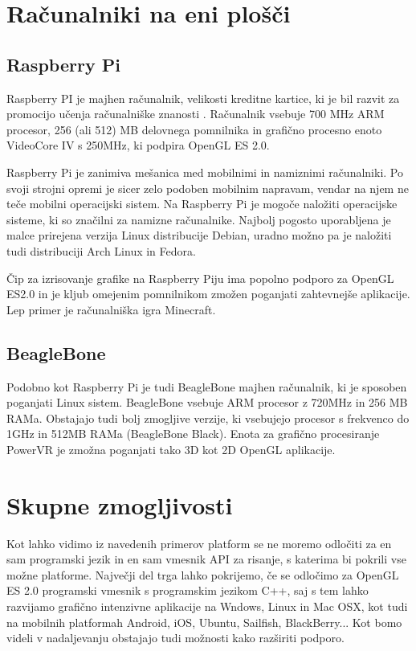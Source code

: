 \section{Računalniki na eni plošči}

\subsection{Raspberry Pi}
\label{sec:raspberryPi}

Raspberry PI je majhen računalnik, velikosti kreditne kartice, ki je bil razvit za promocijo učenja računalniške znanosti \cite{rasPi}. Računalnik vsebuje 700 MHz ARM procesor, 256 (ali 512) MB delovnega pomnilnika in grafično procesno enoto VideoCore IV s 250MHz, ki podpira OpenGL ES 2.0.

Raspberry Pi je zanimiva mešanica med mobilnimi in namiznimi računalniki. Po svoji strojni opremi je sicer zelo podoben mobilnim napravam, vendar na njem ne teče mobilni operacijski sistem. Na Raspberry Pi je mogoče naložiti operacijske sisteme, ki so značilni za namizne računalnike. Najbolj pogosto uporabljena je malce prirejena verzija Linux distribucije Debian, uradno možno pa je naložiti tudi distribuciji Arch Linux in Fedora.

Čip za izrisovanje grafike na Raspberry Piju ima popolno podporo za OpenGL ES2.0 in je kljub omejenim pomnilnikom zmožen poganjati zahtevnejše aplikacije.  Lep primer je računalniška igra Minecraft.

\subsection{BeagleBone}
\label{sec:beagleBone}

Podobno kot Raspberry Pi je tudi BeagleBone \cite{beagleBone} majhen računalnik, ki je sposoben poganjati Linux sistem. BeagleBone vsebuje ARM procesor z 720MHz in 256 MB RAMa. Obstajajo tudi bolj zmogljive verzije, ki vsebujejo procesor s frekvenco do 1GHz in 512MB RAMa (BeagleBone Black). Enota za grafično procesiranje PowerVR je zmožna poganjati tako 3D kot 2D OpenGL aplikacije.

\section{Skupne zmogljivosti}

Kot lahko vidimo iz navedenih primerov platform se ne moremo odločiti za en sam programski jezik in en sam vmesnik API za risanje, s katerima bi pokrili vse možne platforme. Največji del trga lahko pokrijemo, če se odločimo za OpenGL ES 2.0 programski vmesnik s programskim jezikom C++, saj s tem lahko razvijamo grafično intenzivne aplikacije na Wndows, Linux in Mac OSX, kot tudi na mobilnih platformah Android, iOS, Ubuntu, Sailfish, BlackBerry... Kot bomo videli v nadaljevanju obstajajo tudi možnosti kako razširiti podporo.

